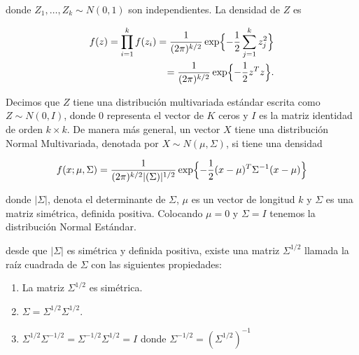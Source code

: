 \documentclass{article}\usepackage[]{graphicx}\usepackage[]{color}
\begin{document}
\vspace{0.3cm}

donde $Z_1, \dots, Z_k \sim N(0,1)$ son independientes. La densidad de $Z$ es

\begin{align*}
f(z) = \prod_{i = 1}^{k}f(z_i) = \frac{1}{(2\pi)^{k/2}}\exp\Bigl\{-\frac{1}{2}\sum_{j = 1}^{k}z_j^{2}\Bigr\}\\
= \frac{1}{(2\pi)^{k/2}}\exp\Bigl\{-\frac{1}{2}z^{T}z\Bigr\}.
\end{align*}

\vspace{0.3cm}

Decimos que $Z$ tiene una distribuci\'on multivariada est\'andar escrita como $Z \sim N(0,I)$, donde $0$ representa el vector de $K$ ceros y $I$ es la matriz identidad  de orden $k \times k$. De manera m\'as general, un vector $X$ tiene una distribuci\'on Normal Multivariada, denotada por $X \sim N(\mu, \Sigma)$, si tiene una densidad

\vspace{0.3cm}

\begin{align}
f(x; \mu, \Sigma) = \frac{1}{(2\pi)^{k/2}\vert (\Sigma)\vert^{1/2}}\exp \Bigl\{-\frac{1}{2}(x - \mu)^{T}\Sigma^{-1}(x - \mu) \Bigr\}
\end{align}

\vspace{0.3cm}


donde $\vert \Sigma \vert$, denota el determinante de $\Sigma$, $\mu$ es un vector de longitud $k$ y $\Sigma$ es una matriz sim\'etrica, definida positiva. Colocando $\mu = 0$ y $\Sigma = I$ tenemos la distribuci\'on Normal Est\'andar.

\vspace{0.3cm}

desde que  $\vert \Sigma \vert$ es sim\'etrica y definida positiva, existe una matriz $\Sigma^{1/2}$ llamada la ra\'iz cuadrada de $\Sigma$ con las siguientes propiedades: 

\begin{enumerate}
\item  La matriz $\Sigma^{1/2}$ es sim\'etrica.
\item $\Sigma = \Sigma^{1/2}\Sigma^{1/2}$.
\item $\Sigma^{1/2}\Sigma^{-1/2} = \Sigma^{-1/2}\Sigma^{1/2} = I$ donde $\Sigma^{-1/2} = (\Sigma^{1/2})^{-1}$
\end{enumerate}

\vspace{0.5cm}
\end{document}
